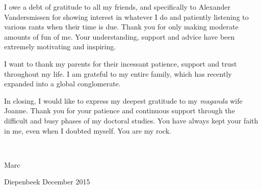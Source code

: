 \newpage
I owe a debt of gratitude to all my friends, and specifically to Alexander Vandersmissen for showing interest in whatever I do and patiently listening to various rants when their time is due. Thank you for only making moderate amounts of fun of me. Your understanding, support and advice have been extremely motivating and inspiring. 

I want to thank my parents for their incessant patience, support and trust throughout my life. I am grateful to my entire family, which has recently expanded into a global conglomerate. 

In closing, I would like to express my deepest gratitude to my \emph{maganda} wife Joanne. Thank you for your patience and continuous support through the difficult and busy phases of my doctoral studies. You have always kept your faith in me, even when I doubted myself. You are my rock.

\ \newline

{\hfill
\begin{minipage}{0.4\textwidth}
Marc\newline

Diepenbeek\newline
December 2015
\end{minipage}
}



\cleardoublepage

